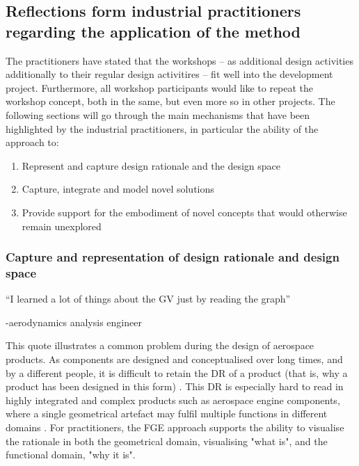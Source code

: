 \documentclass[aerospace,article,submit,moreauthors,pdftex]{Definitions/mdpi}
\begin{document}
\subsection{Reflections form industrial practitioners regarding the application of the method} \label{sec:feedback}

The practitioners have stated that the workshops -- as additional design activities additionally to their regular design activitires -- fit well into the development project.
Furthermore, all workshop participants would like to repeat the workshop concept, both in the same, but even more so in other projects.
The following sections will go through the main mechanisms that have been highlighted by the industrial practitioners, in particular the ability of the approach to:

\begin{enumerate}
	\item Represent and capture design rationale and the design space
	\item Capture, integrate and model novel solutions
	\item Provide support for the embodiment of novel concepts that would otherwise remain unexplored
\end{enumerate}

\subsubsection{Capture and representation of design rationale and design space}

\begin{center}
    “I learned a lot of things about the GV just by reading the graph” 
\end{center}
\begin{flushright}
    -aerodynamics analysis engineer
\end{flushright}


This quote illustrates a common problem during the design of aerospace products.
As components are designed and conceptualised over long times, and by a different people, it is difficult to retain the \acf{DR} of a product (that is, why a product has been designed in this form) \citep{Bracewell2009}. 
This \ac{DR} is especially hard to read in highly integrated and complex products such as aerospace engine components, where a single geometrical artefact may fulfil multiple functions in different domains \cite{Raja2019}.
For practitioners, the FGE approach supports the ability to visualise the rationale in both the geometrical domain, visualising "what is", and the functional domain, "why it is".
\end{document}
